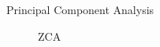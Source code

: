 \documentclass[
	ngerman,
	]{tudaexercise}
\begin{document}
\begin{task}{Principal Component Analysis}
\begin{subtask}
\begin{figure}[H]
\quad
{}
\quad
{}
\caption{ZCA}
\end{figure}
\end{subtask}

\begin{subtask}


\end{subtask}
\end{task}
\end{document}
